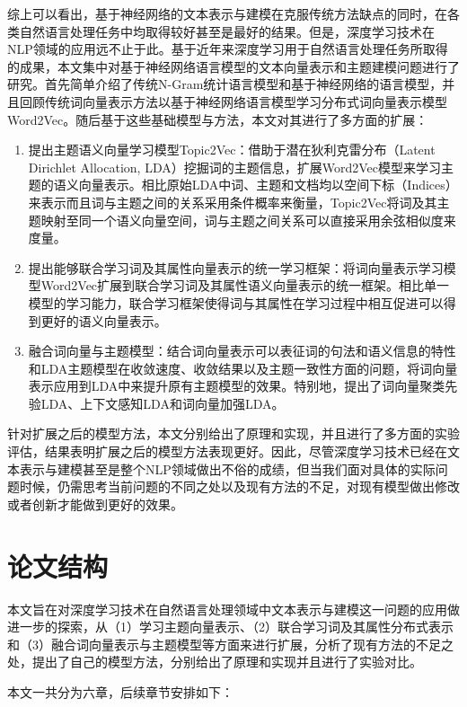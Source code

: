 \documentclass[master]{njuthesis}
\begin{document}
综上可以看出，基于神经网络的文本表示与建模在克服传统方法缺点的同时，在各类自然语言处理任务中均取得较好甚至是最好的结果。但是，深度学习技术在NLP领域的应用远不止于此。基于近年来深度学习用于自然语言处理任务所取得的成果，本文集中对基于神经网络语言模型的文本向量表示和主题建模问题进行了研究。首先简单介绍了传统N-Gram统计语言模型和基于神经网络的语言模型，并且回顾传统词向量表示方法以基于神经网络语言模型学习分布式词向量表示模型Word2Vec。随后基于这些基础模型与方法，本文对其进行了多方面的扩展：

\begin{enumerate}
\item 提出主题语义向量学习模型Topic2Vec：借助于潜在狄利克雷分布（Latent Dirichlet Allocation, LDA）挖掘词的主题信息，扩展Word2Vec模型来学习主题的语义向量表示。相比原始LDA中词、主题和文档均以空间下标（Indices）来表示而且词与主题之间的关系采用条件概率来衡量，Topic2Vec将词及其主题映射至同一个语义向量空间，词与主题之间关系可以直接采用余弦相似度来度量。
\item 提出能够联合学习词及其属性向量表示的统一学习框架：将词向量表示学习模型Word2Vec扩展到联合学习词及其属性语义向量表示的统一框架。相比单一模型的学习能力，联合学习框架使得词与其属性在学习过程中相互促进可以得到更好的语义向量表示。
\item 融合词向量与主题模型：结合词向量表示可以表征词的句法和语义信息的特性和LDA主题模型在收敛速度、收敛结果以及主题一致性方面的问题，将词向量表示应用到LDA中来提升原有主题模型的效果。特别地，提出了词向量聚类先验LDA、上下文感知LDA和词向量加强LDA。
\end{enumerate}
针对扩展之后的模型方法，本文分别给出了原理和实现，并且进行了多方面的实验评估，结果表明扩展之后的模型方法表现更好。因此，尽管深度学习技术已经在文本表示与建模甚至是整个NLP领域做出不俗的成绩，但当我们面对具体的实际问题时候，仍需思考当前问题的不同之处以及现有方法的不足，对现有模型做出修改或者创新才能做到更好的效果。

\section{论文结构}\label{sec_chap1_outline}

本文旨在对深度学习技术在自然语言处理领域中文本表示与建模这一问题的应用做进一步的探索，从（1）学习主题向量表示、（2）联合学习词及其属性分布式表示和（3）融合词向量表示与主题模型等方面来进行扩展，分析了现有方法的不足之处，提出了自己的模型方法，分别给出了原理和实现并且进行了实验对比。

本文一共分为六章，后续章节安排如下：
\end{document}
